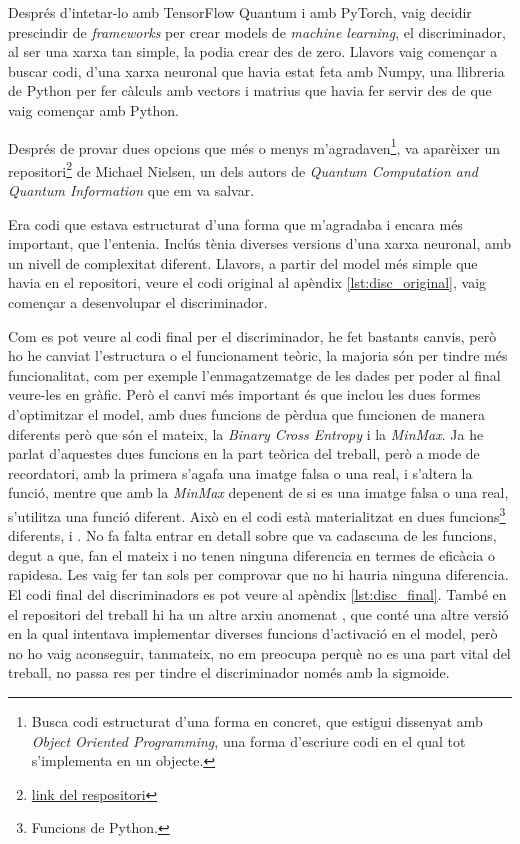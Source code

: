 Després d'intetar-lo amb TensorFlow Quantum i amb PyTorch, vaig decidir prescindir de \textit{frameworks} per crear models de \textit{machine learning}, el discriminador, al ser una xarxa tan simple, la podia crear des de zero. Llavors vaig començar a buscar codi, d'una xarxa neuronal que havia estat feta amb Numpy, una llibreria de Python per fer càlculs amb vectors i matrius que havia fer servir des de que vaig començar amb Python.

Després de provar dues opcions que més o menys m'agradaven\footnote{Busca codi estructurat d'una forma en concret, que estigui dissenyat amb \textit{Object Oriented Programming}, una forma d'escriure codi en el qual tot s'implementa en un objecte.}, va aparèixer un repositori\footnote{\href{https://github.com/mnielsen/neural-networks-and-deep-learning}{link del respositori}} de Michael Nielsen, un dels autors de \textit{Quantum Computation and Quantum Information} \cite{QCandQI} que em va salvar. 

Era codi que estava estructurat d'una forma que m'agradaba i encara més important, que l'entenia. Inclús tènia diverses versions d'una xarxa neuronal, amb un nivell de complexitat diferent. Llavors, a partir del model més simple que havia en el repositori, veure el codi original al apèndix \ref{lst:disc_original}, vaig començar a desenvolupar el discriminador. 

Com es pot veure al codi final per el discriminador, he fet bastants canvis, però ho he canviat l'estructura o el funcionament teòric, la majoria són per tindre més funcionalitat, com per exemple l'enmagatzematge de les dades per poder al final veure-les en gràfic. Però el canvi més important és que inclou les dues formes d'optimitzar el model, amb dues funcions de pèrdua que funcionen de manera diferents però que són el mateix, la \textit{Binary Cross Entropy} i la \textit{MinMax}. Ja he parlat d'aquestes dues funcions en la part teòrica del treball, però a mode de recordatori, amb la primera s'agafa una imatge falsa o una real, i s'altera la funció, mentre que amb la \textit{MinMax} depenent de si es una imatge falsa o una real, s'utilitza una funció diferent. Això en el codi està materialitzat en dues funcions\footnote{Funcions de Python.} diferents,  i . No fa falta entrar en detall sobre que va cadascuna de les funcions, degut a que, fan el mateix i no tenen ninguna diferencia en termes de eficàcia o rapidesa. Les vaig fer tan sols per comprovar que no hi hauria ninguna diferencia. El codi final del discriminadors es pot veure al apèndix \ref{lst:disc_final}. També en el repositori del treball hi ha un altre arxiu anomenat , que conté una altre versió en la qual intentava implementar diverses funcions d'activació en el model, però no ho vaig aconseguir, tanmateix, no em preocupa perquè no es una part vital del treball, no passa res per tindre el discriminador només amb la sigmoide. 

